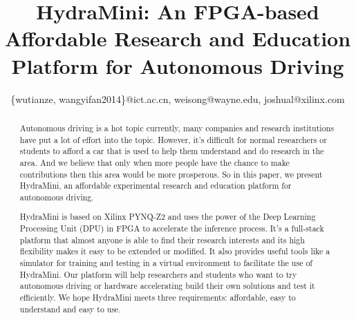 \documentclass[conference]{IEEEtran}
\begin{document}
\title{HydraMini: An FPGA-based Affordable Research and Education Platform for Autonomous Driving}

\author{
{\{wutianze, wangyifan2014\}}@ict.ac.cn, weisong@wayne.edu, joshual@xilinx.com}

\maketitle

\begin{abstract}
Autonomous driving is a hot topic currently, many companies and research institutions have put a lot of effort into the topic. However, it's difficult for normal researchers or students to afford a car that is used to help them understand and do research in the area. And we believe that only when more people have the chance to make contributions then this area would be more prosperous. So in this paper, we present HydraMini, an affordable experimental research and education platform for autonomous driving. 

HydraMini is based on Xilinx PYNQ-Z2 and uses the power of the Deep Learning Processing Unit (DPU) in FPGA to accelerate the inference process. It's a full-stack platform that almost anyone is able to find their research interests and its high flexibility makes it easy to be extended or modified. It also provides useful tools like a simulator for training and testing in a virtual environment to facilitate the use of HydraMini. Our platform will help researchers and students who want to try autonomous driving or hardware accelerating build their own solutions and test it efficiently. We hope HydraMini meets three requirements: affordable, easy to understand and easy to use.
\end{abstract}












\vspace{12pt}
\end{document}
